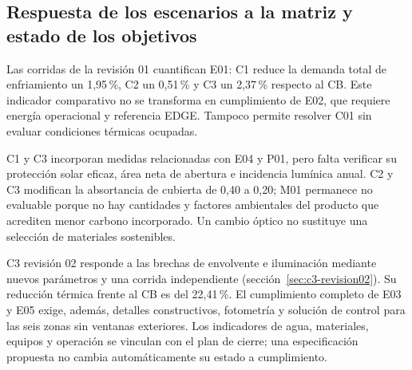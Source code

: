 \subsection{Respuesta de los escenarios a la matriz y estado de los objetivos}
\label{sec:matriz-escenarios}
Las corridas de la revisión 01 cuantifican E01: C1 reduce la demanda total de enfriamiento un 1,95\,\%, C2 un 0,51\,\% y C3 un 2,37\,\% respecto al CB. Este indicador comparativo no se transforma en cumplimiento de E02, que requiere energía operacional y referencia EDGE. Tampoco permite resolver C01 sin evaluar condiciones térmicas ocupadas.

C1 y C3 incorporan medidas relacionadas con E04 y P01, pero falta verificar su protección solar eficaz, área neta de abertura e incidencia lumínica anual. C2 y C3 modifican la absortancia de cubierta de 0,40 a 0,20; M01 permanece no evaluable porque no hay cantidades y factores ambientales del producto que acrediten menor carbono incorporado. Un cambio óptico no sustituye una selección de materiales sostenibles.

C3 revisión 02 responde a las brechas de envolvente e iluminación mediante nuevos parámetros y una corrida independiente (sección~\ref{sec:c3-revision02}). Su reducción térmica frente al CB es del 22,41\,\%. El cumplimiento completo de E03 y E05 exige, además, detalles constructivos, fotometría y solución de control para las seis zonas sin ventanas exteriores. Los indicadores de agua, materiales, equipos y operación se vinculan con el plan de cierre; una especificación propuesta no cambia automáticamente su estado a cumplimiento.

